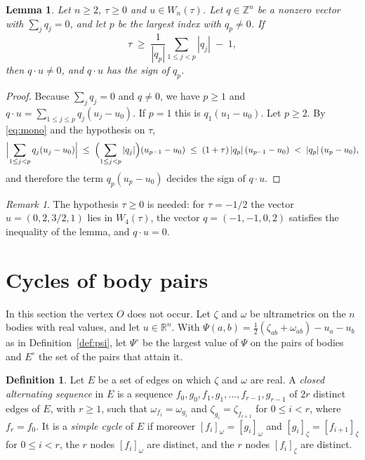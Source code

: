 \documentclass[11pt]{amsart}
\newtheorem{lemma}[theorem]{Lemma}
\theoremstyle{definition}
\newtheorem{definition}[theorem]{Definition}
\theoremstyle{remark}
\newtheorem{remark}[theorem]{Remark}
\numberwithin{equation}{section}
\newcommand{\RR}{\mathbb{R}}
\newcommand{\ZZ}{\mathbb{Z}}
\newcommand{\Po}{\Psi^{\circ}}
\newcommand{\Eo}{E^{\circ}}
\newcommand{\nd}[2]{[#1]_{#2}}
\begin{document}
\begin{lemma}\label{lem:B}
Let $n \ge 2$, $\tau \ge 0$ and $u \in W_n(\tau)$. Let $q \in \ZZ^n$ be a nonzero vector with
$\sum_j q_j = 0$, and let $p$ be the largest index with $q_p \ne 0$. If
\[
  \tau \;\ge\; \frac{1}{|q_p|} \sum_{1 \le j < p} |q_j| \;-\; 1 ,
\]
then $q \cdot u \ne 0$, and $q \cdot u$ has the sign of $q_p$.
\end{lemma}

\begin{proof}
Because $\sum_j q_j = 0$ and $q \ne 0$, we have $p \ge 1$ and
$q \cdot u = \sum_{1 \le j \le p} q_j (u_j - u_0)$. If $p = 1$ this is $q_1 (u_1 - u_0)$. Let $p \ge 2$.
By \eqref{eq:mono} and the hypothesis on $\tau$,
\[
  \Bigl| \sum_{1 \le j < p} q_j (u_j - u_0) \Bigr|
  \;\le\; \Bigl( \sum_{1 \le j < p} |q_j| \Bigr) (u_{p-1} - u_0)
  \;\le\; (1 + \tau)\, |q_p|\, (u_{p-1} - u_0) \;<\; |q_p|\, (u_p - u_0) ,
\]
and therefore the term $q_p (u_p - u_0)$ decides the sign of $q \cdot u$.
\end{proof}

\begin{remark}\label{rem:tau}
The hypothesis $\tau \ge 0$ is needed: for $\tau = -1/2$ the vector $u = (0, 2, 3/2, 1)$ lies in
$W_4(\tau)$, the vector $q = (-1, -1, 0, 2)$ satisfies the inequality of the lemma, and $q \cdot u = 0$.
\end{remark}

\section{Cycles of body pairs}\label{sec:C}

In this section the vertex $O$ does not occur. Let $\zeta$ and $\omega$ be ultrametrics on the $n$
bodies with real values, and let $u \in \RR^n$. With
$\Psi(a, b) = \tfrac12(\zeta_{ab} + \omega_{ab}) - u_a - u_b$ as in Definition~\ref{def:psi}, let $\Po$
be the largest value of $\Psi$ on the pairs of bodies and $\Eo$ the set of the pairs that attain it.

\begin{definition}\label{def:alt}
Let $E$ be a set of edges on which $\zeta$ and $\omega$ are real. A \emph{closed alternating sequence}
in $E$ is a sequence $f_0, g_0, f_1, g_1, \dots, f_{r-1}, g_{r-1}$ of $2r$ distinct edges of $E$, with
$r \ge 1$, such that $\omega_{f_i} = \omega_{g_i}$ and $\zeta_{g_i} = \zeta_{f_{i+1}}$ for
$0 \le i < r$, where $f_r = f_0$. It is a \emph{simple cycle} of $E$ if moreover
$\nd{f_i}{\omega} = \nd{g_i}{\omega}$ and $\nd{g_i}{\zeta} = \nd{f_{i+1}}{\zeta}$ for $0 \le i < r$,
the $r$ nodes $\nd{f_i}{\omega}$ are distinct, and the $r$ nodes $\nd{f_i}{\zeta}$ are distinct.
\end{definition}
\end{document}
